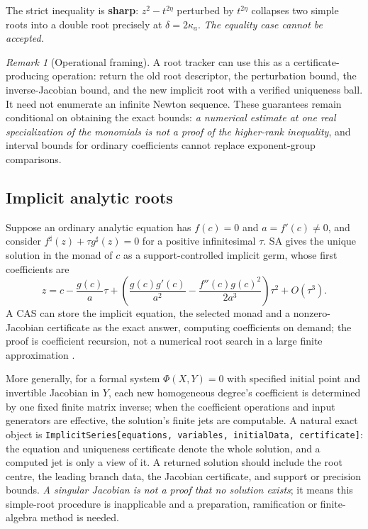 \documentclass[11pt,letterpaper]{article}
\numberwithin{equation}{section}
\theoremstyle{definition}
\theoremstyle{remark}
\newtheorem{remark}[theorem]{Remark}
\newcommand{\sh}{^{\sharp}}
\begin{document}
The strict inequality is \textbf{sharp}: $z^2-t^{2\eta}$ perturbed by
$t^{2\eta}$ collapses two simple roots into a double root precisely at
$\delta=2\kappa_a$. \emph{The equality case cannot be accepted.}

\begin{remark}[Operational framing]\label{cas:rem-multivariateops}
A root tracker can use this as a certificate-producing operation: return the old
root descriptor, the perturbation bound, the inverse-Jacobian bound, and the new
implicit root with a verified uniqueness ball. It need not enumerate an infinite
Newton sequence. These guarantees remain conditional on obtaining the exact
bounds: \emph{a numerical estimate at one real specialization of the monomials
is not a proof of the higher-rank inequality}, and interval bounds for ordinary
coefficients cannot replace exponent-group comparisons.
\end{remark}

\subsection{Implicit analytic roots}
\label{cas:sub-implicit}
Suppose an ordinary analytic equation has $f(c)=0$ and $a=f'(c)\ne0$, and
consider $f\sh(z)+\tau g\sh(z)=0$ for a positive infinitesimal $\tau$. SA gives
the unique solution in the monad of $c$ as a support-controlled implicit germ,
whose first coefficients are
\begin{equation}\label{cas:eq-implicit}
 z=c-\frac{g(c)}{a}\tau
 +\left(\frac{g(c)g'(c)}{a^2}-\frac{f''(c)g(c)^2}{2a^3}\right)\tau^2+O(\tau^3).
\end{equation}
A CAS can store the implicit equation, the selected monad and a nonzero-Jacobian
certificate as the exact answer, computing coefficients on demand; the proof is
coefficient recursion, not a numerical root search in a large finite
approximation \cite{cas:SourceAnalysisTwo}.

More generally, for a formal system $\Phi(X,Y)=0$ with specified initial point
and invertible Jacobian in $Y$, each new homogeneous degree's coefficient is
determined by one fixed finite matrix inverse; when the coefficient operations
and input generators are effective, the solution's finite jets are computable.
A natural exact object is
\texttt{ImplicitSeries[equations, variables, initialData, certificate]}: the
equation and uniqueness certificate denote the whole solution, and a computed
jet is only a view of it. A returned solution should include the root centre,
the leading branch data, the Jacobian certificate, and support or precision
bounds. \emph{A singular Jacobian is not a proof that no solution exists}; it
means this simple-root procedure is inapplicable and a preparation, ramification
or finite-algebra method is needed.
\end{document}
